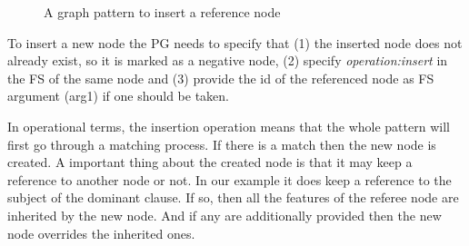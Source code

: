 
    \begin{figure}[!ht]
    \centering
    \caption{A graph pattern to insert a reference node}
    \label{fig:gp5}
    \end{figure}

    
    To insert a new node the PG needs to specify that (1) the inserted node does not already exist, so it is marked as a negative node, (2) specify \textit{operation:insert} in the FS of the same node and (3) provide the id of the referenced node as FS argument (arg1) if one should be taken.

    In operational terms, the insertion operation means that the whole pattern will first go through a matching process. If there is a match then the new node is created. A important thing about the created node is that it may keep a reference to another node or not. In our example it does keep a reference to the subject of the dominant clause. If so, then all the features of the referee node are inherited by the new node. And if any are additionally provided then the new node overrides the inherited ones.

